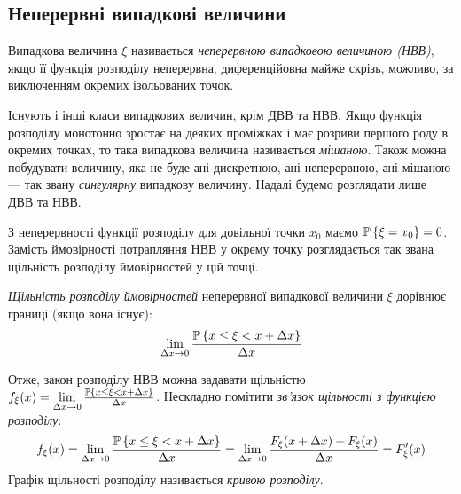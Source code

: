 \subsection{Неперервні випадкові величини}
\begin{definition}
    Випадкова величина $\xi$ називається \emph{неперервною випадковою величиною (НВВ)},
    якщо її функція розподілу неперервна, диференційовна майже скрізь, можливо, за виключенням
    окремих ізольованих точок.
\end{definition}
\begin{remark}
    Існують і інші класи випадкових величин, крім ДВВ та НВВ. Якщо функція розподілу
    монотонно зростає на деяких проміжках і має розриви першого роду в окремих точках,
    то така випадкова величина називається \emph{мішаною}. Також можна побудувати величину,
    яка не буде ані дискретною, ані неперервною, ані мішаною --- так звану \emph{сингулярну} випадкову величину.
    Надалі будемо розглядати лише ДВВ та НВВ.
\end{remark}
З неперервності функції розподілу для довільної точки $x_0$ маємо $\P\left\{\xi = x_0\right\} = 0$.
Замість ймовірності потрапляння НВВ у окрему точку розглядається так звана щільність розподілу ймовірностей у цій точці.

\begin{definition}
    \emph{Щільність розподілу ймовірностей} неперервної випадкової величини $\xi$
    дорівнює границі (якщо вона існує):
    \begin{equation}\label{eq:prob_dens}
        \lim_{\Delta x\rightarrow 0} \frac{\P\left\{x\leq \xi < x+\Delta x\right\}}{\Delta x}
    \end{equation}
\end{definition}
Отже, закон розподілу НВВ можна задавати щільністю $f_\xi(x) = \lim\limits_{\Delta x\rightarrow 0} \frac{\P\left\{x\leq \xi < x+\Delta x\right\}}{\Delta x}$.
Нескладно помітити \emph{зв'язок щільності з функцією розподілу}:
\begin{equation}\label{eq:dens_pdf}
    f_\xi(x) = \lim\limits_{\Delta x\rightarrow 0} \frac{\P\left\{x\leq \xi < x+\Delta x\right\}}{\Delta x} = 
    \lim\limits_{\Delta x\rightarrow 0} \frac{F_\xi(x+\Delta x) - F_\xi(x)}{\Delta x} = F'_\xi(x)
\end{equation}
Графік щільності розподілу називається \emph{кривою розподілу}.

